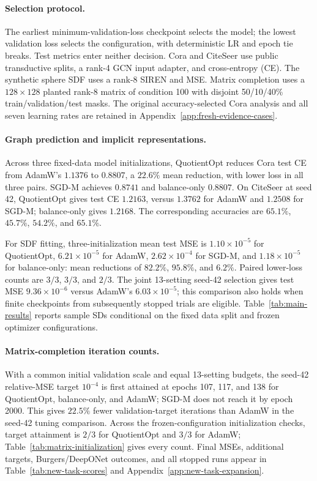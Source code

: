 \paragraph{Selection protocol.}
The earliest minimum-validation-loss checkpoint selects the model;
the lowest validation loss selects the configuration, with deterministic
LR and epoch tie breaks. Test metrics enter neither decision.
Cora and CiteSeer use public transductive splits, a rank-4 GCN input
adapter, and cross-entropy (CE). The synthetic sphere SDF uses a rank-8
SIREN and MSE. Matrix completion uses a $128\times128$ planted rank-8
matrix of condition 100 with disjoint 50/10/40\% train/validation/test
masks. The original accuracy-selected Cora analysis and all seven
learning rates are retained in Appendix~\ref{app:fresh-evidence-cases}.

\paragraph{Graph prediction and implicit representations.}
Across three fixed-data model initializations, QuotientOpt reduces
Cora test CE from AdamW's $1.1376$ to $0.8807$, a $22.6\%$ mean
reduction, with lower loss in all three pairs. SGD-M achieves $0.8741$
and balance-only $0.8807$. On CiteSeer at seed 42, QuotientOpt gives
test CE $1.2163$, versus $1.3762$ for AdamW and $1.2508$ for SGD-M;
balance-only gives $1.2168$. The corresponding accuracies are
$65.1\%$, $45.7\%$, $54.2\%$, and $65.1\%$.

For SDF fitting, three-initialization mean test MSE is
$1.10\times10^{-5}$ for QuotientOpt, $6.21\times10^{-5}$ for AdamW,
$2.62\times10^{-4}$ for SGD-M, and $1.18\times10^{-5}$ for
balance-only: mean reductions of $82.2\%$, $95.8\%$, and $6.2\%$.
Paired lower-loss counts are $3/3$, $3/3$, and $2/3$.
The joint 13-setting seed-42 selection gives test MSE
$9.36\times10^{-6}$ versus AdamW's $6.03\times10^{-5}$; this comparison
also holds when finite checkpoints from subsequently stopped trials
are eligible. Table~\ref{tab:main-results} reports sample SDs conditional
on the fixed data split and frozen optimizer configurations.

\paragraph{Matrix-completion iteration counts.}
With a common initial validation scale and equal 13-setting budgets,
the seed-42 relative-MSE target $10^{-4}$ is first attained at epochs
107, 117, and 138 for QuotientOpt, balance-only, and AdamW; SGD-M does
not reach it by epoch 2000. This gives $22.5\%$ fewer validation-target
iterations than AdamW in the seed-42 tuning comparison.
Across the frozen-configuration initialization checks, target
attainment is $2/3$ for QuotientOpt and $3/3$ for AdamW;
Table~\ref{tab:matrix-initialization} gives every count. Final MSEs,
additional targets, Burgers/DeepONet outcomes, and all stopped runs
appear in Table~\ref{tab:new-task-scores} and
Appendix~\ref{app:new-task-expansion}.

